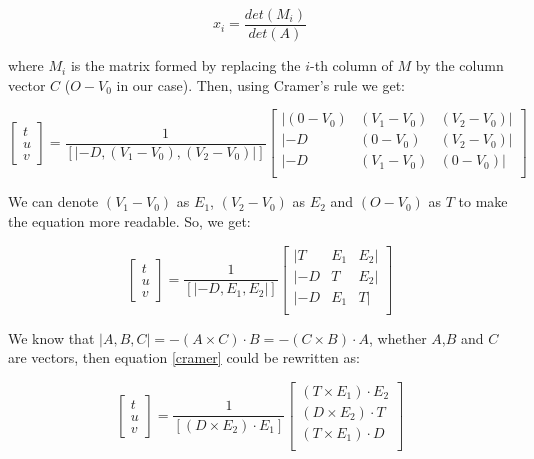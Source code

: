 \documentclass[titlepage,12pt]{report}
\begin{document}
\begin{equation}
x_i = \frac{det(M_i)}{det(A)}
\end{equation}

where $M_i$ is the matrix formed by replacing the $i$-th column of $M$ by the column vector $C$ ($O - V_0$ in our case). Then, using Cramer's rule we get:

\begin{equation}
\begin{bmatrix}
t \\ u \\ v
\end{bmatrix}
=
\frac{1}{\left[|-D, \left(V_1 - V_0\right), \left(V_2 - V_0\right)|\right]}
\begin{bmatrix}
| \left(0 - V_0\right) & \left(V_1 - V_0\right) & \left(V_2 - V_0\right) | \\
| -D & \left(0 - V_0\right) & \left(V_2 - V_0\right) | \\
| -D & \left(V_1 - V_0\right) & \left(0 - V_0\right) | \\
\end{bmatrix}
\end{equation}

We can denote $\left(V_1 - V_0\right)$ as $E_1$, $\left(V_2 - V_0\right)$ as $E_2$ and $\left(O - V_0\right)$ as $T$ to make the equation more readable. So, we get:

\begin{equation} \label{cramer}
\begin{bmatrix}
t \\ u \\ v
\end{bmatrix}
=
\frac{1}{\left[|-D, E_1, E_2|\right]}
\begin{bmatrix}
|  T & E_1 & E_2 | \\
| -D & T & E_2 | \\
| -D & E_1 & T | \\
\end{bmatrix}
\end{equation}

We know that $|A, B, C| = -\left( A \times C \right) \cdot B = -\left( C \times B \right)\cdot A$, whether $A$,$B$ and $C$ are vectors, then equation \ref{cramer} could be rewritten as:

\begin{equation} \label{cramer2}
\begin{bmatrix}
t \\ u \\ v
\end{bmatrix}
=
\frac{1}{\left[\left( D \times E_2 \right) \cdot E_1 \right]}
\begin{bmatrix}
\left( T \times E_1 \right) \cdot E_2 \\
\left( D \times E_2 \right) \cdot T \\
\left( T \times E_1 \right) \cdot D \\
\end{bmatrix}
\end{equation}
\end{document}
